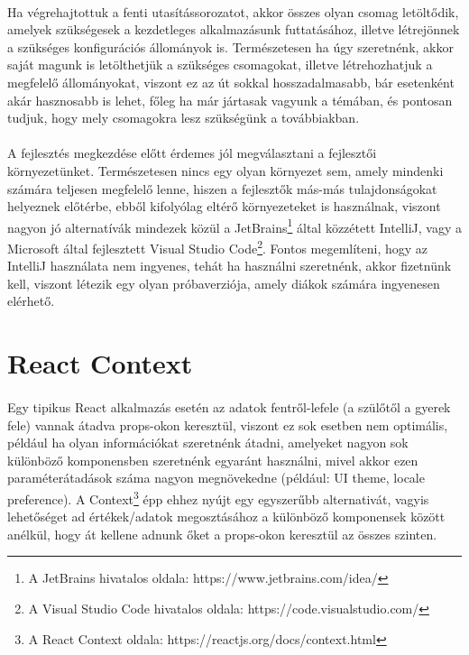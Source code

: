 \paragraph{}
Ha végrehajtottuk a fenti utasítássorozatot, akkor összes olyan csomag letöltődik, amelyek szükségesek a kezdetleges alkalmazásunk futtatásához, illetve létrejönnek a szükséges konfigurációs állományok is.
Természetesen ha úgy szeretnénk, akkor saját magunk is letölthetjük a szükséges csomagokat, illetve létrehozhatjuk a megfelelő állományokat, viszont ez az út sokkal hosszadalmasabb, bár esetenként akár hasznosabb is lehet, főleg ha már jártasak vagyunk a témában, és pontosan tudjuk, hogy mely csomagokra lesz szükségünk a továbbiakban.

\paragraph{}
A fejlesztés megkezdése előtt érdemes jól megválasztani a fejlesztői környezetünket. Természetesen nincs egy olyan környezet sem, amely mindenki számára teljesen megfelelő lenne, hiszen a fejlesztők más-más tulajdonságokat helyeznek előtérbe, ebből kifolyólag eltérő környezeteket is használnak, viszont nagyon jó alternatívák mindezek közül a JetBrains\footnote{A JetBrains hivatalos oldala: https://www.jetbrains.com/idea/} által közzétett IntelliJ, vagy a Microsoft által fejlesztett Visual Studio Code\footnote{A Visual Studio Code hivatalos oldala: https://code.visualstudio.com/}. Fontos megemlíteni, hogy az IntelliJ használata nem ingyenes, tehát ha használni szeretnénk, akkor fizetnünk kell, viszont létezik egy olyan próbaverziója, amely diákok számára ingyenesen elérhető.

\section{React Context}
\paragraph{}
Egy tipikus React alkalmazás esetén az adatok fentről-lefele (a szülőtől a gyerek fele) vannak átadva props-okon keresztül, viszont ez sok esetben nem optimális, például ha olyan információkat szeretnénk átadni, amelyeket nagyon sok különböző komponensben szeretnénk egyaránt használni, mivel akkor ezen paraméterátadások száma nagyon megnövekedne (például: UI theme, locale preference). A Context\footnote{A React Context oldala: https://reactjs.org/docs/context.html} épp ehhez nyújt egy egyszerűbb alternativát, vagyis lehetőséget ad értékek/adatok megosztásához a különböző komponensek között anélkül, hogy át kellene adnunk őket a props-okon keresztül az összes szinten.

